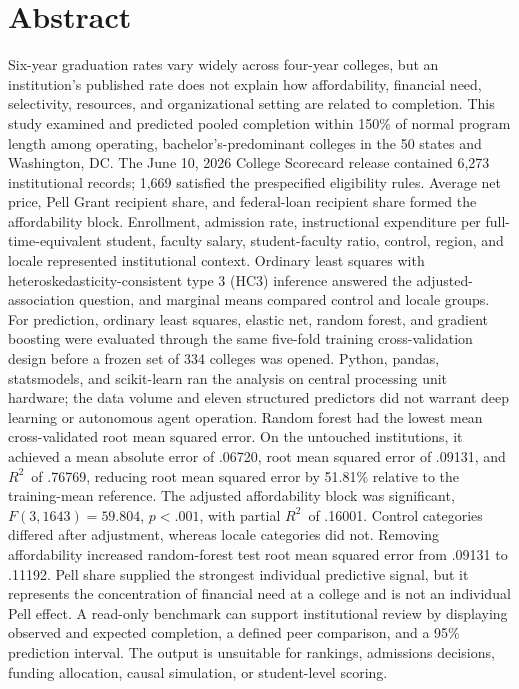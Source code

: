 \documentclass[12pt,a4paper]{article}
\newcommand{\Rtwo}{\ensuremath{R^{2}}}
\begin{document}
\clearpage
\section*{Abstract}

Six-year graduation rates vary widely across four-year colleges, but an institution's published rate does not explain how affordability, financial need, selectivity, resources, and organizational setting are related to completion. This study examined and predicted pooled completion within 150\% of normal program length among operating, bachelor's-predominant colleges in the 50 states and Washington, DC. The June 10, 2026 College Scorecard release contained 6,273 institutional records; 1,669 satisfied the prespecified eligibility rules. Average net price, Pell Grant recipient share, and federal-loan recipient share formed the affordability block. Enrollment, admission rate, instructional expenditure per full-time-equivalent student, faculty salary, student-faculty ratio, control, region, and locale represented institutional context. Ordinary least squares with heteroskedasticity-consistent type 3 (HC3) inference answered the adjusted-association question, and marginal means compared control and locale groups. For prediction, ordinary least squares, elastic net, random forest, and gradient boosting were evaluated through the same five-fold training cross-validation design before a frozen set of 334 colleges was opened. Python, pandas, statsmodels, and scikit-learn ran the analysis on central processing unit hardware; the data volume and eleven structured predictors did not warrant deep learning or autonomous agent operation. Random forest had the lowest mean cross-validated root mean squared error. On the untouched institutions, it achieved a mean absolute error of .06720, root mean squared error of .09131, and \Rtwo\ of .76769, reducing root mean squared error by 51.81\% relative to the training-mean reference. The adjusted affordability block was significant, $F(3,1643)=59.804$, $p<.001$, with partial \Rtwo\ of .16001. Control categories differed after adjustment, whereas locale categories did not. Removing affordability increased random-forest test root mean squared error from .09131 to .11192. Pell share supplied the strongest individual predictive signal, but it represents the concentration of financial need at a college and is not an individual Pell effect. A read-only benchmark can support institutional review by displaying observed and expected completion, a defined peer comparison, and a 95\% prediction interval. The output is unsuitable for rankings, admissions decisions, funding allocation, causal simulation, or student-level scoring.
\end{document}
